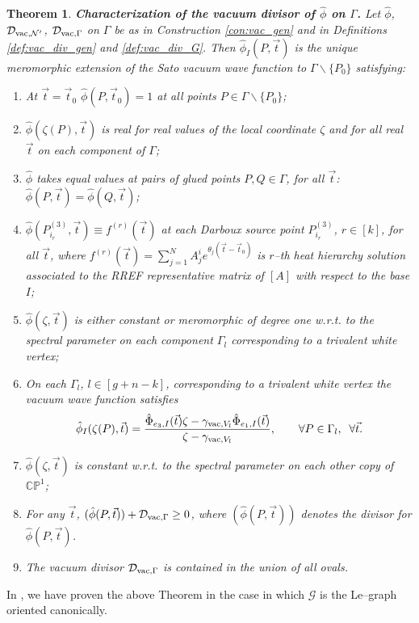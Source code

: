 \documentclass[11pt]{amsart}
\theoremstyle{plain}
\numberwithin{equation}{section}
\newtheorem{theorem}{Theorem}[subsection]
\def \DVG {{\mathcal D}_{\textup{\scriptsize vac},\Gamma}}
\def \DVN {{\mathcal D}_{\textup{\scriptsize vac},{\mathcal N}^{\prime}}}
\def \gvac {\gamma_{\textup{\scriptsize vac},V_l}}
\begin{document}
\begin{theorem}\label{lemma:noneffvac}\textbf{Characterization of the vacuum divisor of $\hat \phi$ on $\Gamma$.}
Let $\hat \phi$, $\DVN$, $\DVG$ on $\Gamma$ be as in Construction \ref{con:vac_gen} and in Definitions \ref{def:vac_div_gen} and \ref{def:vac_div_G}. Then $\hat \phi_I(P,\vec t)$ is the unique meromorphic extension of the Sato vacuum wave function to
$\Gamma\backslash\{P_0\}$ satisfying:
\begin{enumerate}
\item At $\vec t=\vec t_0$ $\hat \phi (P, \vec t_0)=1$ at all points $P\in \Gamma\backslash \{P_0\} $;
\item ${\hat \phi} (\zeta(P), \vec t)$ is real for real values of the local coordinate $\zeta$ and for all real $\vec t$ on each component of $\Gamma$;
\item $\hat \phi$ takes equal values at pairs of glued points $P,Q\in \Gamma$, for all $\vec t$:  $\hat \phi(P, \vec t) = \hat \phi(Q, \vec t)$;
\item $\hat \phi(P^{(3)}_{i_r}, \vec t)\equiv f^{(r)} (\vec t)$ at each Darboux source point $P^{(3)}_{i_r}$, $r\in [k]$, for all $\vec t$, where $f^{(r)} (\vec t) = \sum_{j=1}^N A^i_j e^{\theta_j (\vec t- \vec t_0)}$ is $r$--th heat hierarchy solution associated to the RREF representative matrix of $[A]$ with respect to the base $I$;
\item $\hat \phi(\zeta, \vec t)$ is either constant or meromorphic of degree one w.r.t. to the spectral parameter on each component $\Gamma_l$ corresponding to a trivalent white vertex; 
\item On each $\Gamma_l$, $l\in [g+n-k]$, corresponding to a trivalent white vertex the vacuum wave function satisfies
\[
\hat \phi_I (\zeta(P),\vec t) = \frac{\hat \Phi_{e_3, I} (\vec t) \zeta - \gvac\hat \Phi_{e_1, I} (\vec t) }{ \zeta- \gvac}, \quad\quad \forall P\in \Gamma_l, \;\; \forall \vec t.
\]
\item $\hat \phi(\zeta, \vec t)$ is constant w.r.t. to the spectral parameter on each other copy of $\mathbb{CP}^1$;
\item For any $\vec t$, $(\hat \phi(P,\vec t))+\DVG\ge 0$, where $(\hat \phi(P,\vec t))$ denotes the divisor for   $\hat \phi(P,\vec t)$.
\item The vacuum divisor $\DVG$ is contained in the union of all ovals.  
\end{enumerate}
\end{theorem}

In \cite{AG3}, we have proven the above Theorem in the case in which  ${\mathcal G}$ is the Le--graph oriented canonically.
\end{document}
